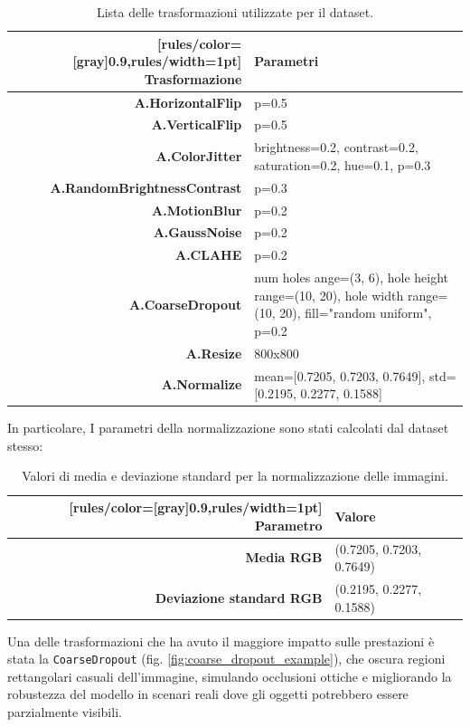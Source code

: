 \documentclass[minted, draw]{../tex/hebdomon}
\begin{document}
%
\begin{table}[H]
	\begin{NiceTabular}{rX}[rules/color=[gray]{0.9},rules/width=1pt]
		\CodeBefore
		\Body
		\toprule
		\textbf{Trasformazione}      & \textbf{Parametri}                                \\
		\midrule
		\textbf{A.HorizontalFlip} & p=0.5          \\
		\textbf{A.VerticalFlip}   & p=0.5        \\
		\textbf{A.ColorJitter} & brightness=0.2, contrast=0.2, saturation=0.2, hue=0.1, p=0.3\\
		\textbf{A.RandomBrightnessContrast} & p=0.3\\
		\textbf{A.MotionBlur} & p=0.2\\
		\textbf{A.GaussNoise} & p=0.2\\
		\textbf{A.CLAHE} & p=0.2 \\
		\textbf{A.CoarseDropout} & num holes ange=(3, 6), hole height range=(10, 20), hole width range=(10, 20), fill="random uniform", p=0.2 \\
		\textbf{A.Resize} & 800x800 \\
		\textbf{A.Normalize} & mean=[0.7205, 0.7203, 0.7649], std=[0.2195, 0.2277, 0.1588] \\
		\bottomrule
	\end{NiceTabular}
	\caption{Lista delle trasformazioni utilizzate per il dataset.}
\end{table}
%

In particolare, I parametri della normalizzazione sono stati calcolati dal dataset stesso:
\begin{table}[!ht]
	\begin{NiceTabular}{rX}[rules/color=[gray]{0.9},rules/width=1pt]
		\CodeBefore
		\Body
		\toprule
		\textbf{Parametro}      & \textbf{Valore}                                \\
		\midrule
		\textbf{Media RGB} & (0.7205, 0.7203, 0.7649) \\
		\textbf{Deviazione standard RGB} & (0.2195, 0.2277, 0.1588) \\
		\bottomrule
	\end{NiceTabular}
	\caption{Valori di media e deviazione standard per la normalizzazione delle immagini.}
\end{table}



Una delle trasformazioni che ha avuto il maggiore impatto sulle prestazioni è stata la \texttt{CoarseDropout} (fig. \ref{fig:coarse_dropout_example}), che oscura regioni rettangolari casuali dell’immagine, simulando occlusioni ottiche e migliorando la robustezza del modello in scenari reali dove gli oggetti potrebbero essere parzialmente visibili.
\end{document}
